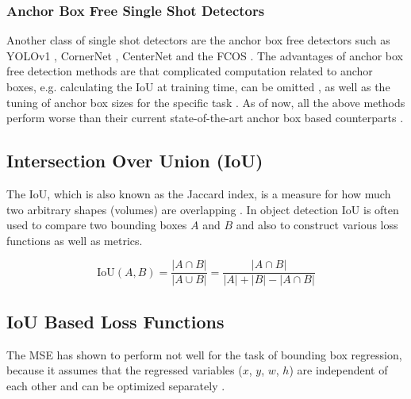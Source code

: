 

\subsubsection{Anchor Box Free Single Shot Detectors}

Another class of single shot detectors are the anchor box free detectors such as \ac{YOLOv1} \cite{yolov1}, CornerNet \cite{corner_net}, CenterNet \cite{center_net} and the \ac{FCOS} \cite{fcos}.
The advantages of anchor box free detection methods are that complicated computation related to anchor boxes, e.g. calculating the \ac{IoU} at training time, can be omitted \cite{fcos}, as well as the tuning of anchor box sizes for the specific task \cite{center_net}.
As of now, all the above methods perform worse than their current state-of-the-art anchor box based counterparts \cite{yolov4}.



\subsection{Intersection Over Union (IoU)}

The \ac{IoU}, which is also known as the Jaccard index, is a measure for how much two arbitrary shapes (volumes) are overlapping \cite{giou}.
In object detection \ac{IoU} is often used to compare two bounding boxes $A$ and $B$ and also to construct various loss functions as well as metrics.

\begin{equation}
    \text{IoU}(A, B) = \frac{|A \cap B|}{|A \cup B|} = \frac{| A \cap B |}{|A| + |B| - |A \cap B|}
\end{equation}


\subsection{IoU Based Loss Functions}

The \ac{MSE} has shown to perform not well for the task of bounding box regression, because it assumes that the regressed variables ($x$, $y$, $w$, $h$) are independent of each other and can be optimized separately \cite{iou}.

